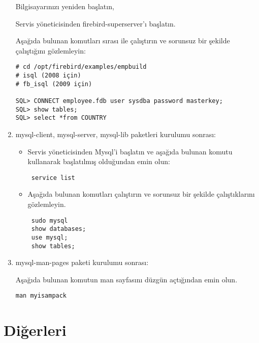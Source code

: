 \documentclass[a4paper,10pt]{article}
\begin{document}
\begin{enumerate}
Bilgisayarınızı yeniden başlatın,

Servis yöneticisinden firebird-superserver'ı başlatın.

Aşağıda bulunan komutları sırası ile çalıştırın ve sorunsuz bir şekilde çalıştığını gözlemleyin:
\begin{verbatim}
# cd /opt/firebird/examples/empbuild
# isql (2008 için)
# fb_isql (2009 için)

SQL> CONNECT employee.fdb user sysdba password masterkey;
SQL> show tables;
SQL> select *from COUNTRY
\end{verbatim}

 \item mysql-client, mysql-server, mysql-lib paketleri kurulumu sonrası:
\begin{itemize}
 \item Servis yöneticisinden Mysql'i başlatın ve  aşağıda bulunan komutu kullanarak başlatılmış olduğundan emin olun:

\begin{verbatim}
 service list
\end{verbatim}
 \item Aşağıda bulunan komutları çalıştırın ve sorunsuz bir şekilde çalıştıklarını gözlemleyin.
\begin{verbatim}
 sudo mysql 
 show databases;
 use mysql;
 show tables;
\end{verbatim}


\end{itemize}

\item mysql-man-pages paketi kurulumu sonrası:

Aşağıda bulunan komutun man sayfasını düzgün açtığından emin olun.
\begin{verbatim}
man myisampack 
\end{verbatim}

\end{enumerate}

\section{Diğerleri}
\end{document}
